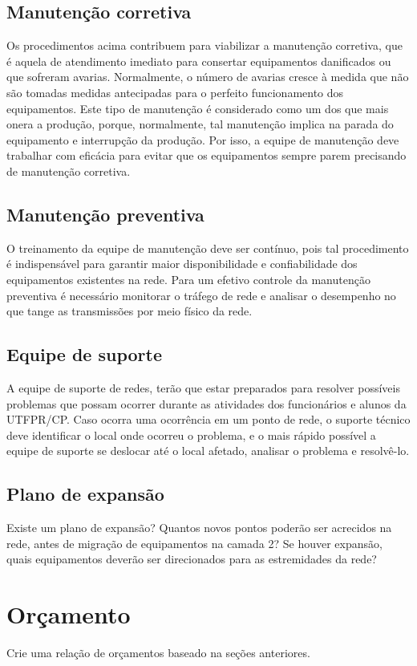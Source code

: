 \documentclass[	DIV=calc,%
							paper=a4,%
							fontsize=12pt,%
							onecolumn]{scrartcl}	 					%
\begin{document}
\subsection{Manutenção corretiva}
Os procedimentos acima contribuem para viabilizar a manutenção corretiva, que é aquela de atendimento imediato para consertar equipamentos danificados ou que sofreram avarias. Normalmente, o número de avarias cresce à medida que não são tomadas medidas antecipadas para o perfeito funcionamento dos equipamentos.
Este tipo de manutenção é considerado como um dos que mais onera a produção, porque, normalmente, tal manutenção implica na parada do equipamento e interrupção da produção. Por isso, a equipe de manutenção deve trabalhar com eficácia para evitar que os equipamentos sempre parem precisando de manutenção corretiva.
\subsection{Manutenção preventiva}
O treinamento da equipe de manutenção deve ser contínuo, pois tal procedimento é indispensável para garantir maior disponibilidade e confiabilidade dos equipamentos existentes na rede. Para um efetivo controle da manutenção preventiva é necessário monitorar o tráfego de rede e analisar o desempenho no que tange as transmissões por meio físico da rede. 
\subsection{Equipe de suporte}
A equipe de suporte de redes, terão que estar preparados para resolver possíveis problemas que possam ocorrer durante as atividades dos funcionários e alunos da UTFPR/CP. Caso ocorra uma ocorrência em um ponto de rede, o suporte técnico deve identificar o local onde ocorreu o problema, e o mais rápido possível a equipe de suporte se deslocar até o local afetado, analisar o problema e resolvê-lo.


\subsection{Plano de expansão}
Existe um plano de expansão? Quantos novos pontos poderão ser acrecidos na rede, antes de migração de equipamentos na camada 2? Se houver expansão, quais equipamentos deverão ser direcionados para as estremidades da rede? 


\section{Orçamento}
Crie uma relação de orçamentos baseado na seções anteriores.
\end{document}
